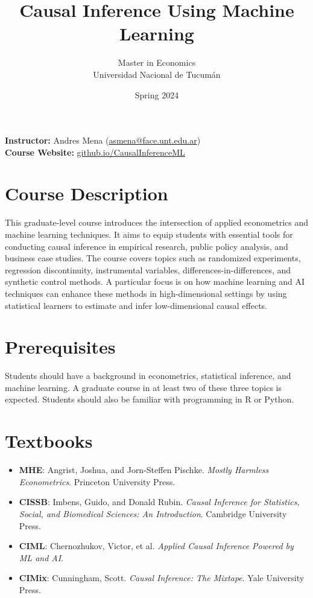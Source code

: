 \documentclass[12pt]{article}
\title{Causal Inference Using Machine Learning}
\author{\large Master in Economics \\ Universidad Nacional de Tucumán}
\date{\large Spring 2024}
\begin{document}
\maketitle

\noindent
\textbf{Instructor:} Andres Mena (\href{mailto:asmena@face.unt.edu.ar}{asmena@face.unt.edu.ar}) \\[0.5em]
\textbf{Course Website:} \small \href{http://www.github.io/CausalInferenceML}{\textcolor{myblue}{github.io/CausalInferenceML}}
\section*{Course Description}

This graduate-level course introduces the intersection of applied econometrics and machine learning techniques. It aims to equip students with essential tools for conducting causal inference in empirical research, public policy analysis, and business case studies. The course covers topics such as randomized experiments, regression discontinuity, instrumental variables, differences-in-differences, and synthetic control methods. A particular focus is on how machine learning and AI techniques can enhance these methods in high-dimensional settings by using statistical learners to estimate and infer low-dimensional causal effects.

\section*{Prerequisites}
Students should have a background in econometrics, statistical inference, and machine learning. A graduate course in at least two of these three topics is expected. Students should also be familiar with programming in R or Python.

\section*{Textbooks}
\begin{itemize}
    \item \textbf{MHE}: Angrist, Joshua, and Jorn-Steffen Pischke. \textit{Mostly Harmless Econometrics}. Princeton University Press.
    \item \textbf{CISSB}: Imbens, Guido, and Donald Rubin. \textit{Causal Inference for Statistics, Social, and Biomedical Sciences: An Introduction}. Cambridge University Press.
    \item \textbf{CIML}: Chernozhukov, Victor, et al. \textit{Applied Causal Inference Powered by ML and AI}.
    \item \textbf{CIMix}: Cunningham, Scott. \textit{Causal Inference: The Mixtape}. Yale University Press.
\end{itemize}
\end{document}

